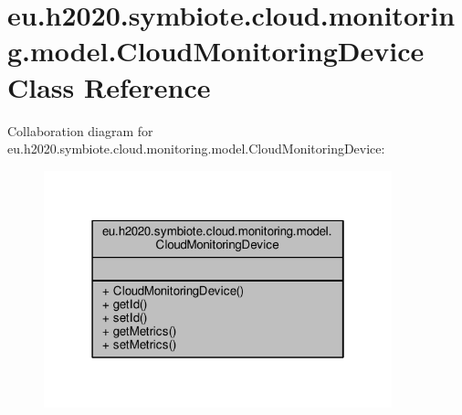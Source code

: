 \hypertarget{classeu_1_1h2020_1_1symbiote_1_1cloud_1_1monitoring_1_1model_1_1CloudMonitoringDevice}{}\section{eu.\+h2020.\+symbiote.\+cloud.\+monitoring.\+model.\+Cloud\+Monitoring\+Device Class Reference}
\label{classeu_1_1h2020_1_1symbiote_1_1cloud_1_1monitoring_1_1model_1_1CloudMonitoringDevice}


Collaboration diagram for eu.\+h2020.\+symbiote.\+cloud.\+monitoring.\+model.\+Cloud\+Monitoring\+Device\+:\nopagebreak
\begin{figure}[H]
\begin{center}
\leavevmode
\includegraphics[width=286pt]{classeu_1_1h2020_1_1symbiote_1_1cloud_1_1monitoring_1_1model_1_1CloudMonitoringDevice__coll__graph}
\end{center}
\end{figure}
